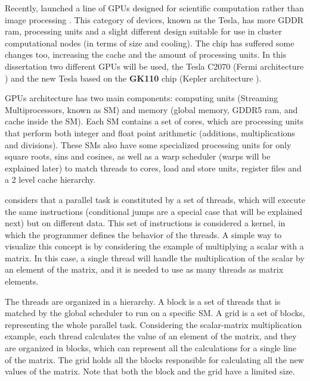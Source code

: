 Recently, \nvidia \cite{NVIDIA} launched a line of GPUs designed for scientific computation rather than image processing \cite{NVIDIA:Tesla}. This category of devices, known as the Tesla, has more GDDR ram, processing units and a slight different design suitable for use in cluster computational nodes (in terms of size and cooling). The chip has suffered some changes too, increasing the cache and the amount of processing units. In this dissertation two different \nvidia GPUs will be used, the \nvidia Tesla C2070 (Fermi architecture \cite{NVIDIA:Fermi}) and the new \nvidia Tesla based on the \textbf{GK110} chip (Kepler architecture \cite{NVIDIA:Kepler}).

\nvidia GPUs architecture has two main components: computing units (Streaming Multiprocessors, known as SM) and memory  (global memory, GDDR5 ram, and cache inside the SM). Each SM contains a set of \cuda cores, which are processing units that perform both integer and float point arithmetic (additions, multiplications and divisions). These SMs also have some specialized processing units for only square roots, sins and cosines, as well as a warp scheduler (warps will be explained later) to match \cuda threads to \cuda cores, load and store units, register files and a 2 level cache hierarchy.

\nvidia considers that a parallel task is constituted by a set of \cuda threads, which will execute the same instructions (conditional jumps are a special case that will be explained next) but on different data. This set of instructions is considered a \cuda kernel, in which the programmer defines the behavior of the \cuda threads. A simple way to visualize this concept is by considering the example of multiplying a scalar with a matrix. In this case, a single thread will handle the multiplication of the scalar by an element of the matrix, and it is needed to use as many \cuda threads as matrix elements.

The \cuda threads are organized in a hierarchy. A block is a set of \cuda threads that is matched by the global scheduler to run on a specific SM. A grid is a set of blocks, representing the whole parallel task. Considering the scalar-matrix multiplication example, each \cuda thread calculates the value of an element of the matrix, and they are organized in blocks, which can represent all the calculations for a single line of the matrix. The grid holds all the blocks responsible for calculating all the new values of the matrix. Note that both the block and the grid have a limited size.

